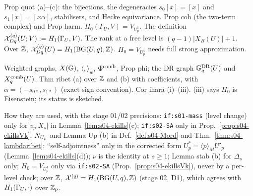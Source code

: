 \begin{interface}
Prop quot (a)--(c): the bijections, the degeneracies $s_0[x]=[x]$ and $s_1[x]=[x\alpha]$, stabilisers, and Hecke equivariance.
Prop coh (the two-term complex) and Prop harm. $H_0(\Gamma_U,V)=V_{U_p^1}$. The definition $\mathcal{X}^{(q)}_{Dq}(U;V):=H_1(\Gamma_U,V)$.
The rank at a free level is $(q-1)|X_B(U)|+1$. Over $\mathbb{Z}$, $\mathcal{X}^{(q)}_{Dq}(U)=H_1(\mathrm{BG}(U,q),\mathbb{Z})$. $H_0=V_{U_p^1}$ needs full strong approximation. 
\end{interface}
\begin{interface}
Weighted graphs, $X(\mathbb{G})$, $\langle,\rangle_w$, $\Phi^{\mathrm{comb}}$, Prop phi; the DR graph $\mathbb{G}^{\mathrm{DR}}_q(U)$ and $X^{\mathrm{comb}}_q(U)$. Thm ribet (a) over
$\mathbb{Z}$ and (b) with coefficients, with $\alpha=(-s_{0*},s_{1*})$ (exact sign convention). Cor ihara (i)--(iii). (iii) says $H_0$ is
Eisenstein; its status is sketched. 
\end{interface}
\noindent How they are used, with the stage 01/02 precisions: \texttt{if:s01-mass} (level change) only for $v_p|X_s|$ in
Lemma~\ref{lem:s04-ekills}(c); \texttt{if:s02-SA} only in Prop.~\ref{prop:s04-ekillsVk}; $N_{U_p}$ and Lemma Up (b) in Def.~\ref{def:s04-Mord} and
Thm.~\ref{thm:s04-lambdaribet}; ``self-adjointness'' only in the corrected form $U_p^*=\langle p\rangle_MU'_p$ (Lemma~\ref{lem:s04-ekills}(d));
$\nu$ is the identity at $s\ge1$; Lemma stab (b) for $\Delta_s$ only; $H_0=V_{U^1_p}$ only via \texttt{if:s02-SA} (Prop.~\ref{prop:s04-ekillsVk}),
never by a per-level check; over $\mathbb{Z}$, $\mathcal{X}^{(q)}=H_1(\mathrm{BG}(U,q),\mathbb{Z})$ (stage 02, D1), which agrees with $H_1(\Gamma_U,\cdot)$ over $\mathbb{Z}_p$.

